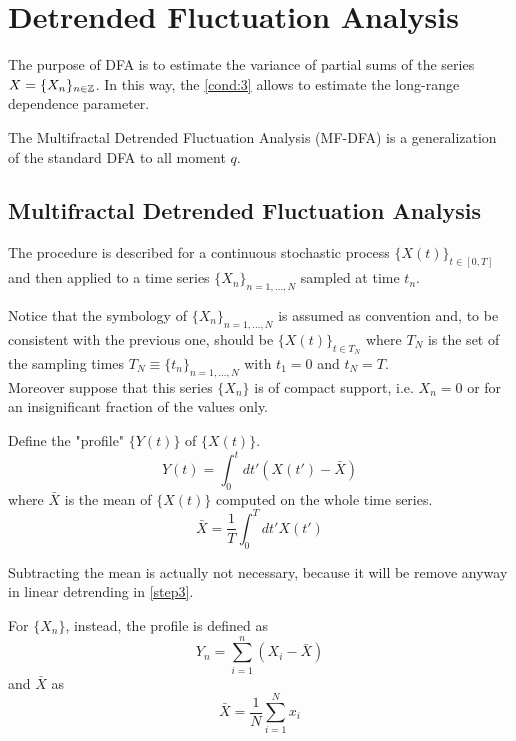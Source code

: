 \section{Detrended Fluctuation Analysis}\label{sec:dfa}

The purpose of DFA is to estimate the variance of partial sums of the series $X = \{ X_n \}_{n \in \mathbb{Z}}$. In this way, the \autoref{cond:3} allows to estimate the long-range dependence parameter. 

The Multifractal Detrended Fluctuation Analysis (MF-DFA) is a generalization of the standard DFA to all moment $q$. 

\subsection{Multifractal Detrended Fluctuation Analysis}
The procedure is described for a continuous stochastic process $\{X(t)\}_{t\in [0, T]}$ and then applied to a time series $\{ X_n \}_{n = 1, \dots, N} $ sampled at time $t_n$.

Notice that the symbology of $\{ X_n \}_{n = 1, \dots, N} $ is assumed as convention and, to be consistent with the previous one, should be
$\{ X(t) \}_{t \in T_N}$ where $T_N$ is the set of the sampling times $T_N \equiv \{ t_n\}_{n = 1, \dots, N}$ with $t_1 = 0$ and $t_N = T$. \\
Moreover suppose that this series $\{ X_n \}$ is of compact support, i.e. $X_n = 0$ or for an insignificant fraction of the values only. 

\begin{step}\label{step1}
Define the "profile" $\{Y(t)\}$ of $\{X(t)\}$.
\begin{equation*}
	Y( t ) = \int_{0}^{t} dt' (X( t' ) - \bar{X} ) 
\end{equation*}
where $\bar{X}$ is the mean of $\{X(t)\}$ computed on the whole time series.
\begin{equation*}
	\bar{X} = \frac{1}{T} \int_{0}^{T} dt' X( t' )
\end{equation*}

Subtracting the mean is actually not necessary, because it will be remove anyway in linear detrending in \autoref{step3}.

For $\{X_n\}$, instead, the profile is defined as 
\begin{equation*}
	Y_n = \sum_{i=1}^{n} \left( X_i - \bar{X} \right)
\end{equation*}
and $\bar{X}$ as 
\begin{equation*}
	\bar{X} = \frac{1}{N} \sum_{i=1}^{N} x_i 
\end{equation*}
\end{step}


